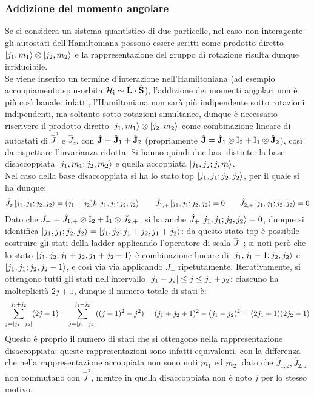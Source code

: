 \subsubsection{Addizione del momento angolare}

Se si considera un sistema quantistico di due particelle, nel caso non-interagente gli autostati dell'Hamiltoniana possono essere scritti come prodotto diretto $ \ket{j_1,m_1} \otimes \ket{j_2,m_2} $ e la rappresentazione del gruppo di rotazione risulta dunque irriducibile.\\
Se viene inserito un termine d'interazione nell'Hamiltoniana (ad esempio accoppiamento spin-orbita $ \mathcal{H}_{\text{i}} \sim \hat{\mathbf{L}} \cdot \hat{\mathbf{S}} $), l'addizione dei momenti angolari non è più così banale: infatti, l'Hamiltoniana non sarà più indipendente sotto rotazioni indipendenti, ma soltanto sotto rotazioni simultanee, dunque è necessario riscrivere il prodotto diretto $ \ket{j_1,m_1} \otimes \ket{j_2,m_2} $ come combinazione lineare di autostati di $ \hat{J}^2 $ e $ \hat{J}_z $, con $ \hat{\mathbf{J}} \equiv \hat{\mathbf{J}}_1 + \hat{\mathbf{J}}_2 $ (propriamente $ \hat{\mathbf{J}} = \hat{\mathbf{J}}_1 \otimes \mathrm{I}_2 + \mathrm{I}_1 \otimes \hat{\mathbf{J}}_2 $), così da rispettare l'invarianza ridotta. Si hanno quindi due basi distinte: la base disaccoppiata $ \ket{j_1,m_1 ; j_2,m_2} $ e quella accoppiata $ \ket{j_1,j_2 ; j,m} $.\\
Nel caso della base disaccoppiata si ha lo stato top $ \ket{j_1, j_1 ; j_2, j_2} $, per il quale si ha dunque:
\begin{equation*}
	\hat{J}_z \ket{j_1,j_1 ; j_2,j_2} = (j_1 + j_2) \hbar \ket{j_1,j_1 ; j_2,j_2}
	\qquad
	\hat{J}_{1,+} \ket{j_1,j_1 ; j_2,j_2} = 0
	\qquad
	\hat{J}_{2,+} \ket{j_1,j_1 ; j_2,j_2} = 0
\end{equation*}
Dato che $ \hat{J}_+ = \hat{J}_{1,+} \otimes \mathrm{I}_2 + \mathrm{I}_1 \otimes \hat{J}_{2,+} $, si ha anche $ \hat{J}_+ \ket{j_1,j_1 ; j_2,j_2} = 0 $, dunque si identifica $ \ket{j_1,j_1 ; j_2,j_2} = \ket{j_1,j_2 ; j_1 + j_2, j_1 + j_2} $: da questo stato top è possibile costruire gli stati della ladder applicando l'operatore di scala $ \hat{J}_- $; si noti però che lo stato $ \ket{j_1,j_2 ; j_1 + j_2 , j_1 + j_2 - 1} $ è combinazione lineare di $ \ket{j_1,j_1 - 1 ; j_2,j_2} $ e $ \ket{j_1,j_1 ; j_2, j_2 - 1} $, e così via via applicando $ \hat{J}_- $ ripetutamente. Iterativamente, si ottengono tutti gli stati nell'intervallo $ \left\lvert j_1 - j_2\right\rvert \le j \le j_1 + j_2 $: ciascuno ha molteplicità $ 2j + 1 $, dunque il numero totale di stati è:
\begin{equation*}
	\sum_{j = \left\lvert j_1 - j_2\right\rvert}^{j_1 + j_2} (2j + 1) = \sum_{j = \left\lvert j_1 - j_2\right\rvert}^{j_1 + j_2} ((j+1)^2 - j^2) = (j_1 + j_2 + 1)^2 - (j_1 - j_2)^2 = (2j_1 + 1) (2j_2 + 1)
\end{equation*}
Questo è proprio il numero di stati che si ottengono nella rappresentazione disaccoppiata: queste rappresentazioni sono infatti equivalenti, con la differenza che nella rappresentazione accoppiata non sono noti $ m_1 $ ed $ m_2 $, dato che $ \hat{J}_{1,z},\hat{J}_{2,z} $ non commutano con $ \hat{J}^2 $, mentre in quella disaccoppiata non è noto $ j $ per lo stesso motivo.

